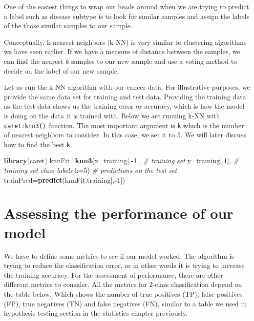 \documentclass[12pt,]{krantz}
\newenvironment{Shaded}{\begin{snugshade}}{\end{snugshade}}
\newcommand{\CommentTok}[1]{\textcolor[rgb]{0.56,0.35,0.01}{\textit{#1}}}
\newcommand{\DataTypeTok}[1]{\textcolor[rgb]{0.13,0.29,0.53}{#1}}
\newcommand{\DecValTok}[1]{\textcolor[rgb]{0.00,0.00,0.81}{#1}}
\newcommand{\KeywordTok}[1]{\textcolor[rgb]{0.13,0.29,0.53}{\textbf{#1}}}
\newcommand{\NormalTok}[1]{#1}
\newcommand{\OperatorTok}[1]{\textcolor[rgb]{0.81,0.36,0.00}{\textbf{#1}}}
\begin{document}
One of the easiest things to wrap our heads around when we are trying to predict a label such as disease subtype is to look for similar samples and assign the labels of the those similar samples to our sample.

Conceptually, k-nearest neighbors (k-NN) is very similar to clustering algorithms we have seen earlier. If we have a measure of distance between the samples, we can find the nearest \(k\) samples to our new sample and use a voting method to decide on the label of our new sample.

Let us run the k-NN algorithm with our cancer data. For illustrative purposes, we provide the same data set for training and test data. Providing the training data as the test data shows us the training error or accuracy, which is how the model is doing on the data it is trained with. Below we are running k-NN with \texttt{caret:knn3()} function. The most important argument is \texttt{k} which is the number of nearest neighbors to consider. In this case, we set it to 5. We will later discuss how to find the best \texttt{k}.

\begin{Shaded}
\begin{Highlighting}[]
\KeywordTok{library}\NormalTok{(caret)}
\NormalTok{knnFit=}\KeywordTok{knn3}\NormalTok{(}\DataTypeTok{x=}\NormalTok{training[,}\OperatorTok{-}\DecValTok{1}\NormalTok{], }\CommentTok{# training set}
            \DataTypeTok{y=}\NormalTok{training[,}\DecValTok{1}\NormalTok{], }\CommentTok{# training set class labels}
            \DataTypeTok{k=}\DecValTok{5}\NormalTok{)}
\CommentTok{# predictions on the test set}
\NormalTok{trainPred=}\KeywordTok{predict}\NormalTok{(knnFit,training[,}\OperatorTok{-}\DecValTok{1}\NormalTok{])}
\end{Highlighting}
\end{Shaded}

\hypertarget{assessing-the-performance-of-our-model}{%
\section{Assessing the performance of our model}\label{assessing-the-performance-of-our-model}}

We have to define some metrics to see if our model worked. The algorithm is trying to reduce the classification error, or in other words it is trying to increase the training accuracy. For the assessment of performance, there are other different metrics to consider. All the metrics for 2-class classification depend on the table below. Which shows the number of true positives (TP), false positives (FP), true negatives (TN) and false negatives (FN), similar to a table we used in hypothesis testing section in the statistics chapter previously.
\end{document}
